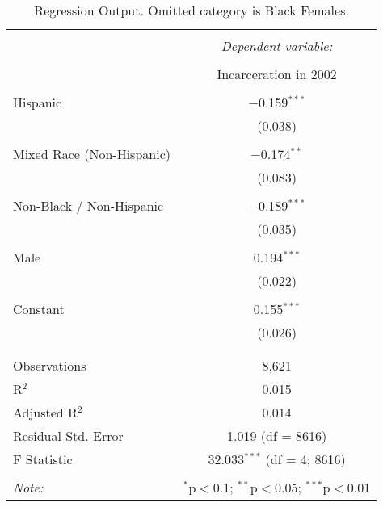 
\begin{table}[!htbp] \centering 
  \caption{Regression Output. Omitted category is Black Females.} 
  \label{tab:regression} 
\begin{tabular}{@{\extracolsep{5pt}}lc} 
\\[-1.8ex]\hline 
\hline \\[-1.8ex] 
 & \multicolumn{1}{c}{\textit{Dependent variable:}} \\ 
\cline{2-2} 
\\[-1.8ex] & Incarceration in 2002 \\ 
\hline \\[-1.8ex] 
 Hispanic & $-$0.159$^{***}$ \\ 
  & (0.038) \\ 
  & \\ 
 Mixed Race (Non-Hispanic) & $-$0.174$^{**}$ \\ 
  & (0.083) \\ 
  & \\ 
 Non-Black / Non-Hispanic & $-$0.189$^{***}$ \\ 
  & (0.035) \\ 
  & \\ 
 Male & 0.194$^{***}$ \\ 
  & (0.022) \\ 
  & \\ 
 Constant & 0.155$^{***}$ \\ 
  & (0.026) \\ 
  & \\ 
\hline \\[-1.8ex] 
Observations & 8,621 \\ 
R$^{2}$ & 0.015 \\ 
Adjusted R$^{2}$ & 0.014 \\ 
Residual Std. Error & 1.019 (df = 8616) \\ 
F Statistic & 32.033$^{***}$ (df = 4; 8616) \\ 
\hline 
\hline \\[-1.8ex] 
\textit{Note:}  & \multicolumn{1}{r}{$^{*}$p$<$0.1; $^{**}$p$<$0.05; $^{***}$p$<$0.01} \\ 
\end{tabular} 
\end{table} 
